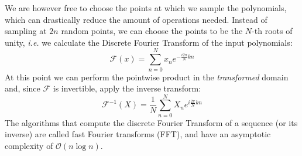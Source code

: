 We are however free to choose the points at which we sample the polynomials, which can drastically reduce the amount of operations needed.
    Instead of sampling at $2n$ random points, we can choose the points to be the $N$-th roots of unity, \textit{i.e.} we calculate the Discrete
    Fourier Transform of the input polynomials:
    \begin{equation}
        \mathcal{F}(x) = \sum_{n=0}^{N} x_n e^{-\frac{i2\pi}{N}kn}
    \end{equation}\label{DFT}
    At this point we can perform the pointwise product in the \textit{transformed} domain and, since $\mathcal{F}$ is invertible, apply the inverse transform:
    \begin{equation}
        \mathcal{F}^{-1}(X) = \frac{1}{N}\sum_{n=0}^{N} X_n e^{i\frac{2\pi}{N}kn}
    \end{equation}
    The algorithms that compute the discrete Fourier Transform of a sequence (or its inverse) are called fast Fourier transforms (FFT), and have an asymptotic complexity
    of $\mathcal{O}(n\log n)$.

